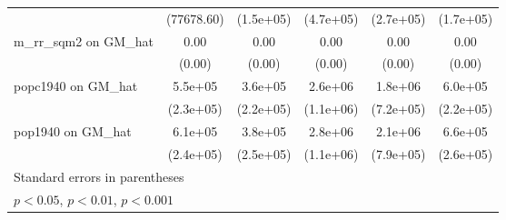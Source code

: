 \begin{table}[htbp]
\begin{tabular}{l*{5}{c}}
                &(77678.60)         &(1.5e+05)         &(4.7e+05)         &(2.7e+05)         &(1.7e+05)         \\
\addlinespace
m\_rr\_sqm2 on GM\_hat&     0.00\sym{*}  &     0.00\sym{*}  &     0.00\sym{**} &     0.00         &     0.00\sym{*}  \\
                &   (0.00)         &   (0.00)         &   (0.00)         &   (0.00)         &   (0.00)         \\
\addlinespace
popc1940 on GM\_hat&  5.5e+05\sym{*}  &  3.6e+05         &  2.6e+06\sym{*}  &  1.8e+06\sym{*}  &  6.0e+05\sym{**} \\
                &(2.3e+05)         &(2.2e+05)         &(1.1e+06)         &(7.2e+05)         &(2.2e+05)         \\
\addlinespace
pop1940 on GM\_hat&  6.1e+05\sym{*}  &  3.8e+05         &  2.8e+06\sym{*}  &  2.1e+06\sym{**} &  6.6e+05\sym{*}  \\
                &(2.4e+05)         &(2.5e+05)         &(1.1e+06)         &(7.9e+05)         &(2.6e+05)         \\
\bottomrule
\multicolumn{6}{l}{\footnotesize Standard errors in parentheses}\\
\multicolumn{6}{l}{\footnotesize \sym{*} \(p<0.05\), \sym{**} \(p<0.01\), \sym{***} \(p<0.001\)}\\
\end{tabular}
\end{table}
